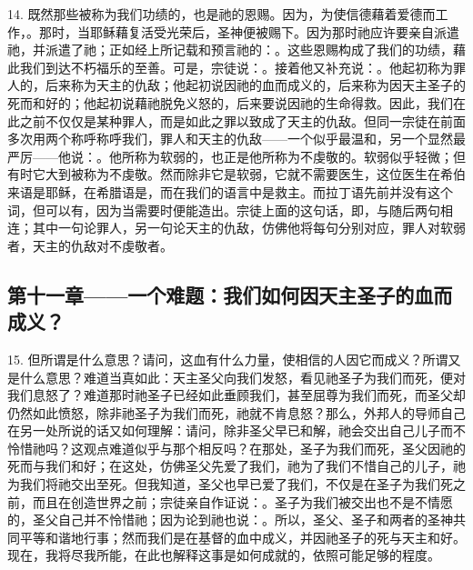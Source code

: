 14. 既然那些被称为我们功绩的，也是祂的恩赐。因为，为使信德藉着爱德而工作，。那时，当耶稣藉复活受光荣后，圣神便被赐下。因为那时祂应许要亲自派遣祂，并派遣了祂；正如经上所记载和预言祂的：。这些恩赐构成了我们的功绩，藉此我们到达不朽福乐的至善。可是，宗徒说：。接着他又补充说：。他起初称为罪人的，后来称为天主的仇敌；他起初说因祂的血而成义的，后来称为因天主圣子的死而和好的；他起初说藉祂脱免义怒的，后来要说因祂的生命得救。因此，我们在此之前不仅仅是某种罪人，而是如此之罪以致成了天主的仇敌。但同一宗徒在前面多次用两个称呼称呼我们，罪人和天主的仇敌——一个似乎最温和，另一个显然最严厉——他说：。他所称为软弱的，也正是他所称为不虔敬的。软弱似乎轻微；但有时它大到被称为不虔敬。然而除非它是软弱，它就不需要医生，这位医生在希伯来语是耶稣，在希腊语是，而在我们的语言中是救主。而拉丁语先前并没有这个词，但可以有，因为当需要时便能造出。宗徒上面的这句话，即，与随后两句相连；其中一句论罪人，另一句论天主的仇敌，仿佛他将每句分别对应，罪人对软弱者，天主的仇敌对不虔敬者。\par


\subsection{第十一章——一个难题：我们如何因天主圣子的血而成义？}

15. 但所谓是什么意思？请问，这血有什么力量，使相信的人因它而成义？所谓又是什么意思？难道当真如此：天主圣父向我们发怒，看见祂圣子为我们而死，便对我们息怒了？难道那时祂圣子已经如此垂顾我们，甚至屈尊为我们而死，而圣父却仍然如此愤怒，除非祂圣子为我们而死，祂就不肯息怒？那么，外邦人的导师自己在另一处所说的话又如何理解：请问，除非圣父早已和解，祂会交出自己儿子而不怜惜祂吗？这观点难道似乎与那个相反吗？在那处，圣子为我们而死，圣父因祂的死而与我们和好；在这处，仿佛圣父先爱了我们，祂为了我们不惜自己的儿子，祂为我们将祂交出至死。但我知道，圣父也早已爱了我们，不仅是在圣子为我们死之前，而且在创造世界之前；宗徒亲自作证说：。圣子为我们被交出也不是不情愿的，圣父自己并不怜惜祂；因为论到祂也说：。所以，圣父、圣子和两者的圣神共同平等和谐地行事；然而我们是在基督的血中成义，并因祂圣子的死与天主和好。现在，我将尽我所能，在此也解释这事是如何成就的，依照可能足够的程度。\par

